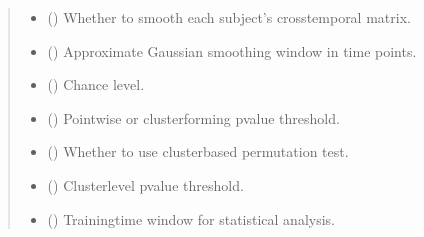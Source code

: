 \documentclass[letterpaper,10pt,english]{sphinxhowto}
\begin{document}
\begin{fulllineitems}
\begin{quote}
\begin{description}
\begin{itemize}
\item {} 
\sphinxAtStartPar
{} (\sphinxstyleliteralemphasis{\sphinxupquote{, }}) \textendash{} Whether to smooth each subject’s cross\sphinxhyphen{}temporal matrix.

\item {} 
\sphinxAtStartPar
{} (\sphinxstyleliteralemphasis{\sphinxupquote{, }}) \textendash{} Approximate Gaussian smoothing window in time points.

\item {} 
\sphinxAtStartPar
{} (\sphinxstyleliteralemphasis{\sphinxupquote{, }}) \textendash{} Chance level.

\item {} 
\sphinxAtStartPar
{} (\sphinxstyleliteralemphasis{\sphinxupquote{, }}) \textendash{} Point\sphinxhyphen{}wise or cluster\sphinxhyphen{}forming p\sphinxhyphen{}value threshold.

\item {} 
\sphinxAtStartPar
{} (\sphinxstyleliteralemphasis{\sphinxupquote{, }}) \textendash{} Whether to use cluster\sphinxhyphen{}based permutation test.

\item {} 
\sphinxAtStartPar
{} (\sphinxstyleliteralemphasis{\sphinxupquote{, }}) \textendash{} Cluster\sphinxhyphen{}level p\sphinxhyphen{}value threshold.

\item {} 
\sphinxAtStartPar
{} (\sphinxstyleliteralemphasis{\sphinxupquote{, }}) \textendash{} 
\sphinxAtStartPar
Training\sphinxhyphen{}time window for statistical analysis.


\end{itemize}
\end{description}
\end{quote}
\end{fulllineitems}
\end{document}
